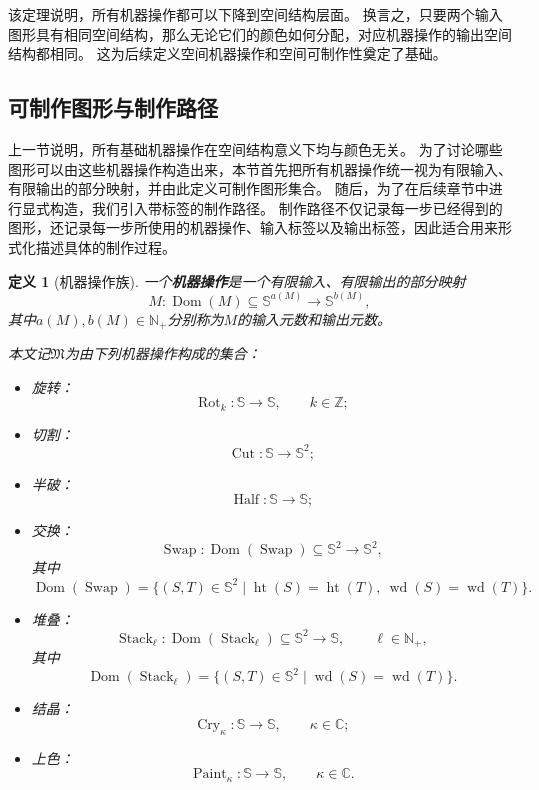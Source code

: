 \documentclass[UTF8,fontset=none]{ctexart}
\theoremstyle{cnthm}
\newtheorem{definition}{定义}[section]
\begin{document}
			该定理说明，所有机器操作都可以下降到空间结构层面。
			换言之，只要两个输入图形具有相同空间结构，那么无论它们的颜色如何分配，对应机器操作的输出空间结构都相同。
			这为后续定义空间机器操作和空间可制作性奠定了基础。
			
		\subsection{可制作图形与制作路径}
			
			上一节说明，所有基础机器操作在空间结构意义下均与颜色无关。
			为了讨论哪些图形可以由这些机器操作构造出来，本节首先把所有机器操作统一视为有限输入、有限输出的部分映射，并由此定义可制作图形集合。
			随后，为了在后续章节中进行显式构造，我们引入带标签的制作路径。
			制作路径不仅记录每一步已经得到的图形，还记录每一步所使用的机器操作、输入标签以及输出标签，因此适合用来形式化描述具体的制作过程。
						
			\begin{definition}[机器操作族]
				一个\textbf{机器操作}是一个有限输入、有限输出的部分映射
				$$
				M:\operatorname{Dom}(M)\subseteq \mathbb{S}^{a(M)}
				\longrightarrow
				\mathbb{S}^{b(M)},
				$$
				其中$a(M),b(M)\in\mathbb{N}_{+}$分别称为$M$的输入元数和输出元数。
				
				本文记$\mathfrak{M}$为由下列机器操作构成的集合：
				\begin{itemize}
					\item 旋转：
					$$
					\operatorname{Rot}_k:\mathbb{S}\to\mathbb{S},
					\qquad k\in\mathbb{Z};
					$$
					\item 切割：
					$$
					\operatorname{Cut}:\mathbb{S}\to\mathbb{S}^2;
					$$
					\item 半破：
					$$
					\operatorname{Half}:\mathbb{S}\to\mathbb{S};
					$$
					\item 交换：
					$$
					\operatorname{Swap}:
					\operatorname{Dom}(\operatorname{Swap})\subseteq\mathbb{S}^2
					\longrightarrow
					\mathbb{S}^2,
					$$
					其中
					$$
					\operatorname{Dom}(\operatorname{Swap})
					=
					\{(S,T)\in\mathbb{S}^2
					\mid
					\operatorname{ht}(S)=\operatorname{ht}(T),\ 
					\operatorname{wd}(S)=\operatorname{wd}(T)\}.
					$$
					\item 堆叠：
					$$
					\operatorname{Stack}_{\ell}:
					\operatorname{Dom}(\operatorname{Stack}_{\ell})\subseteq\mathbb{S}^2
					\longrightarrow
					\mathbb{S},
					\qquad \ell\in\mathbb{N}_{+},
					$$
					其中
					$$
					\operatorname{Dom}(\operatorname{Stack}_\ell)
					=
					\{(S,T)\in\mathbb{S}^2
					\mid
					\operatorname{wd}(S)=\operatorname{wd}(T)\}.
					$$
					\item 结晶：
					$$
					\operatorname{Cry}_{\kappa}:\mathbb{S}\to\mathbb{S},
					\qquad \kappa\in\mathbb{C};
					$$
					\item 上色：
					$$
					\operatorname{Paint}_{\kappa}:\mathbb{S}\to\mathbb{S},
					\qquad \kappa\in\mathbb{C}.
					$$
				\end{itemize}
			\end{definition}
			
\end{document}
